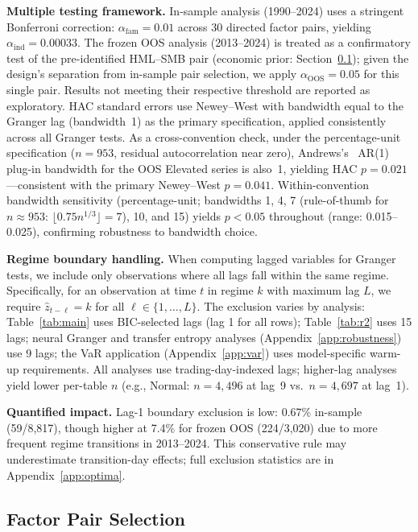 \documentclass[sigconf,anonymous]{acmart}
\begin{document}
\textbf{Multiple testing framework.}
In-sample analysis (1990--2024) uses a stringent Bonferroni correction:
$\alpha_{\text{fam}} = 0.01$ across 30 directed factor pairs, yielding
$\alpha_{\text{ind}} = 0.00033$. The frozen OOS analysis (2013--2024) is treated
as a confirmatory test of the pre-identified HML--SMB pair (economic prior:
Section~\ref{sec:pairselection}); given the design's separation from in-sample
pair selection, we apply $\alpha_{\text{OOS}} = 0.05$ for this single pair.
Results not meeting their respective threshold are reported as exploratory. HAC standard errors use Newey--West
with bandwidth equal to the Granger lag (bandwidth~1) as the primary specification,
applied consistently across all Granger tests. As a cross-convention check,
under the percentage-unit specification ($n = 953$, residual autocorrelation near zero),
Andrews's~\cite{andrews1991heteroskedasticity} AR(1) plug-in bandwidth for the
OOS Elevated series is also~1, yielding HAC $p = 0.021$---consistent with
the primary Newey--West $p = 0.041$.
Within-convention bandwidth sensitivity (percentage-unit; bandwidths 1, 4, 7
(rule-of-thumb for $n \approx 953$: $\lfloor 0.75 n^{1/3} \rfloor = 7$), 10, and 15)
yields $p < 0.05$ throughout (range: 0.015--0.025), confirming robustness to bandwidth choice.

\textbf{Regime boundary handling.} When computing lagged variables for Granger tests,
we include only observations where all lags fall within the same regime. Specifically,
for an observation at time $t$ in regime $k$ with maximum lag $L$, we require
$\hat{z}_{t-\ell} = k$ for all $\ell \in \{1, \ldots, L\}$. The exclusion varies
by analysis: Table~\ref{tab:main} uses BIC-selected lags (lag 1 for all rows);
Table~\ref{tab:r2} uses 15 lags; neural Granger and transfer entropy analyses
(Appendix~\ref{app:robustness}) use 9 lags; the VaR application
(Appendix~\ref{app:var}) uses model-specific warm-up requirements.
All analyses use trading-day-indexed lags; higher-lag analyses yield lower per-table $n$
(e.g., Normal: $n = 4{,}496$ at lag~9 vs.\ $n = 4{,}697$ at lag~1).

\textbf{Quantified impact.} Lag-1 boundary exclusion is low: 0.67\% in-sample (59/8,817),
though higher at 7.4\% for frozen OOS (224/3,020) due to more frequent
regime transitions in 2013--2024. This conservative rule may underestimate
transition-day effects; full exclusion statistics are in Appendix~\ref{app:optima}.

\subsection{Factor Pair Selection}
\label{sec:pairselection}
\end{document}
